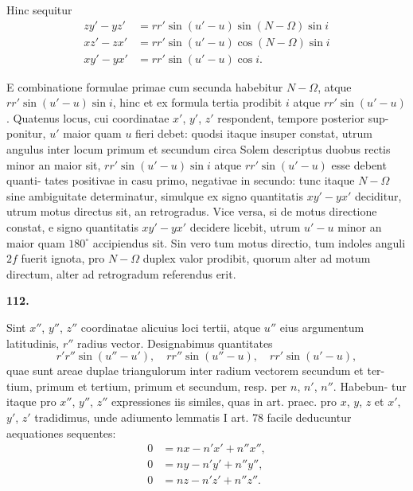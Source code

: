 \documentclass[12pt,a4paper]{article}
\begin{document}
Hinc sequitur
\begin{align*}
zy' - yz' &= rr'\sin(u' - u)\sin(N - \Omega)\sin i \\
xz' - zx' &= rr'\sin(u' - u)\cos(N - \Omega)\sin i \\
xy' - yx' &= rr'\sin(u' - u)\cos i.
\end{align*}

E combinatione formulae primae cum secunda habebitur $N - \Omega$, atque
$rr'\sin(u' - u)\sin i$, hinc et ex formula tertia prodibit $i$ atque $rr'\sin(u' - u)$.
Quatenus locus, cui coordinatae $x'$, $y'$, $z'$ respondent, tempore posterior sup-
ponitur, $u'$ maior quam $u$ fieri debet: quodsi itaque insuper constat, utrum
angulus inter locum primum et secundum circa Solem descriptus duobus rectis
minor an maior sit, $rr'\sin(u' - u)\sin i$ atque $rr'\sin(u' - u)$ esse debent quanti-
tates positivae in casu primo, negativae in secundo: tunc itaque $N - \Omega$ sine
ambiguitate determinatur, simulque ex signo quantitatis $xy' - yx'$ deciditur,
utrum motus directus sit, an retrogradus. Vice versa, si de motus directione
constat, e signo quantitatis $xy' - yx'$ decidere licebit, utrum $u' - u$ minor an
maior quam $180^\circ$ accipiendus sit. Sin vero tum motus directio, tum indoles
anguli $2f$ fuerit ignota, pro $N - \Omega$ duplex valor prodibit, quorum alter ad
motum directum, alter ad retrogradum referendus erit.

\bigskip
\noindent\textbf{112.}

Sint $x''$, $y''$, $z''$ coordinatae alicuius loci tertii, atque $u''$ eius argumentum
latitudinis, $r''$ radius vector. Designabimus quantitates
\[
r'r''\sin(u'' - u'), \quad rr''\sin(u'' - u), \quad rr'\sin(u' - u),
\]
quae sunt areae duplae triangulorum inter radium vectorem secundum et ter-
tium, primum et tertium, primum et secundum, resp. per $n$, $n'$, $n''$. Habebun-
tur itaque pro $x''$, $y''$, $z''$ expressiones iis similes, quas in art. praec. pro $x$, $y$, $z$
et $x'$, $y'$, $z'$ tradidimus, unde adiumento lemmatis I art. 78 facile deducuntur
aequationes sequentes:
\begin{align*}
0 &= nx - n'x' + n''x'', \\
0 &= ny - n'y' + n''y'', \\
0 &= nz - n'z' + n''z''.
\end{align*}
\end{document}
